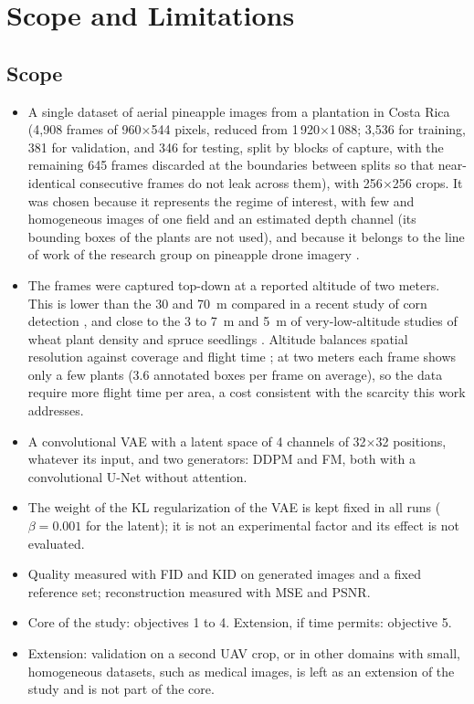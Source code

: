 \section{Scope and Limitations}

\subsection{Scope}

\begin{itemize}
  \item A single dataset of aerial pineapple images from a plantation in Costa Rica (4,908 frames of 960$\times$544 pixels, reduced from 1\,920$\times$1\,088; 3,536 for training, 381 for validation, and 346 for testing, split by blocks of capture, with the remaining 645 frames discarded at the boundaries between splits so that near-identical consecutive frames do not leak across them), with 256$\times$256 crops. It was chosen because it represents the regime of interest, with few and homogeneous images of one field and an estimated depth channel (its bounding boxes of the plants are not used), and because it belongs to the line of work of the research group on pineapple drone imagery \cite{XieLi2024,Fallas2023,XieLi2025VAE,Gonzalez2026}.
  \item The frames were captured top-down at a reported altitude of two meters. This is lower than the 30 and 70~m compared in a recent study of corn detection \cite{Barboza2025}, and close to the 3 to 7~m and 5~m of very-low-altitude studies of wheat plant density \cite{Jin2017} and spruce seedlings \cite{Lopatin2023}. Altitude balances spatial resolution against coverage and flight time \cite{Guess2025}; at two meters each frame shows only a few plants (3.6 annotated boxes per frame on average), so the data require more flight time per area, a cost consistent with the scarcity this work addresses.
  \item A convolutional VAE with a latent space of 4 channels of 32$\times$32 positions, whatever its input, and two generators: DDPM and FM, both with a convolutional U-Net without attention.
  \item The weight of the KL regularization of the VAE is kept fixed in all runs ($\beta=0.001$ for the latent); it is not an experimental factor and its effect is not evaluated.
  \item Quality measured with FID and KID on generated images and a fixed reference set; reconstruction measured with MSE and PSNR.
  \item Core of the study: objectives 1 to 4. Extension, if time permits: objective 5.
  \item Extension: validation on a second UAV crop, or in other domains with small, homogeneous datasets, such as medical images, is left as an extension of the study and is not part of the core.
\end{itemize}

